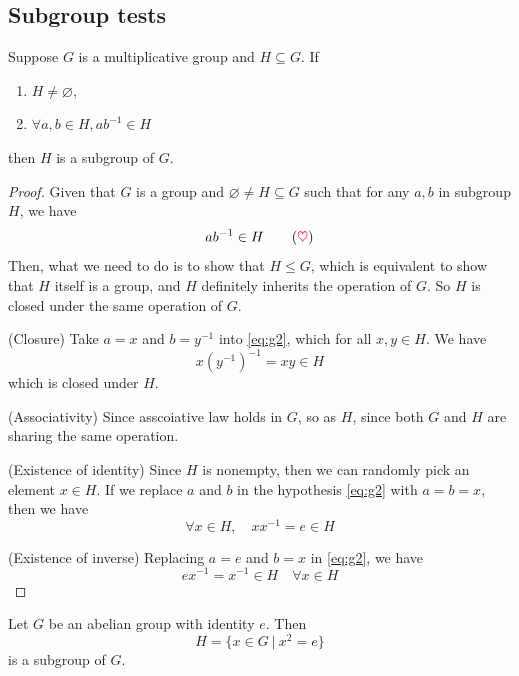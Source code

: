 \subsection{Subgroup tests}

\begin{theorem}
    Suppose $G$ is a multiplicative group and $H \subseteq G$. If 
    \begin{enumerate}
        \item $H \neq \varnothing$,
        \item $\forall a, b \in H, ab^{-1} \in H$
    \end{enumerate}
    then $H$ is a subgroup of $G$. 
\end{theorem}
\begin{proof}
    Given that $G$ is a group and $\varnothing \neq H \subseteq G$ such that for any $a, b$ in subgroup $H$, we have 
    \begin{equation*}
        ab^{-1} \in H   \label{eq:g2} \tag{{\color{red} $\heartsuit $}}
    \end{equation*}
    Then, what we need to do is to show that $H \leq G$, which is equivalent to show that $H$ itself is a group, and $H$ 
    definitely inherits the operation of $G$. So $H$ is closed under the same operation of $G$.

    (Closure) Take $a = x$ and $b = y^{-1}$ into \eqref{eq:g2}, which for all $x, y \in H$. We have 
    \[
        x(y^{-1})^{-1} = xy \in H
    \]
    which is closed under $H$.

    (Associativity) Since asscoiative law holds in $G$, so as $H$, since both $G$ and $H$ are sharing the 
    same operation.
    
    (Existence of identity) Since $H$ is nonempty, then we can randomly pick an element $x \in H$. If we 
    replace $a$ and $b$ in the hypothesis \eqref{eq:g2} with $a = b = x$, then we have 
    \[
        \forall x \in H,\quad xx^{-1} = e \in H
    \]

    (Existence of inverse) Replacing $a = e$ and $b = x$ in \eqref{eq:g2}, we have 
    \[
        ex^{-1} = x^{-1} \in H \quad \forall x \in H 
    \]
\end{proof}

\begin{example}
    Let $G$ be an abelian group with identity $e$. Then 
    \[
        H = \{ x \in G \> | \> x^2 = e \}
    \]
    is a subgroup of $G$.
\end{example}

